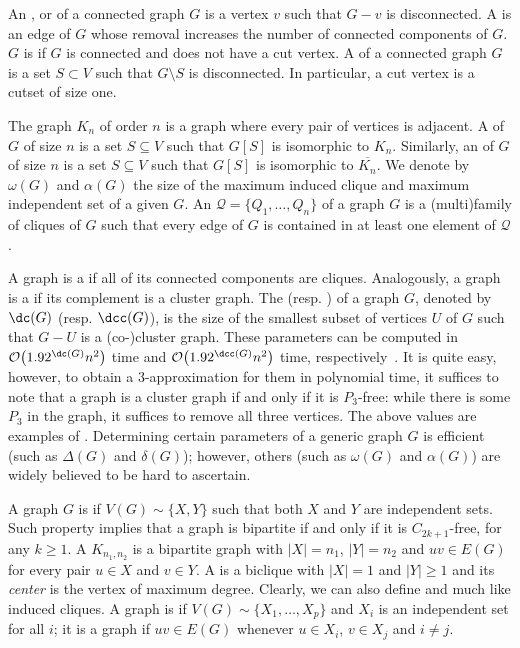 An ,  or  of a connected graph $G$ is a vertex $v$ such that $G - v$ is disconnected.
A  is an edge of $G$ whose removal increases the number of connected components of $G$.
$G$ is  if $G$ is connected and does not have a cut vertex.
A  of a connected graph $G$ is a set $S \subset V$ such that $G \setminus S$ is disconnected.
In particular, a cut vertex is a cutset of size one.

The  graph $K_n$ of order $n$ is a graph where every pair of vertices is adjacent.
A  of $G$ of size $n$ is a set $S \subseteq V$ such that $G[S]$ is isomorphic to $K_n$.
Similarly, an  of $G$ of size $n$ is a set $S \subseteq V$ such that $G[S]$ is isomorphic to $\overline{K_n}$.
We denote by $\omega(G)$ and $\alpha(G)$ the size of the maximum induced clique and maximum independent set of a given $G$.
An  $\mathcal{Q} = \{Q_1, \dots, Q_n\}$ of a graph $G$ is a (multi)family of cliques of $G$ such that every edge of $G$ is contained in at least one element of $\mathcal{Q}$.

A graph is a  if all of its connected components are cliques.
Analogously, a graph is a  if its complement is a cluster graph.
The  (resp. ) of a graph $G$, denoted by $\dc(G)$ (resp. $\dcc(G)$), is the size of the smallest subset of vertices $U$ of $G$ such that $G - U$ is a (co-)cluster graph.
These parameters can be computed in $\bigO{1.92^{\dc( G )}n^2 }$
time and $\bigO{1.92^{\dcc( G )}n^2 }$ time, respectively~\citep{branching-cluster}.
It is quite easy, however, to obtain a 3-approximation for them in polynomial time, it suffices to note that a graph is a cluster graph if and only if it is $P_3$-free: while there is some $P_3$ in the graph, it suffices to remove all three vertices.
The above values are examples of .
Determining certain parameters of a generic graph $G$ is efficient (such as $\Delta(G)$ and $\delta(G)$); however, others (such as $\omega(G)$ and $\alpha(G)$) are widely believed to be hard to ascertain.

A graph $G$ is  if $V(G) \sim \{X, Y\}$ such that both $X$ and $Y$ are independent sets.
Such property implies that a graph is bipartite if and only if it is $C_{2k+1}$-free, for any $k \geq 1$.
A  $K_{n_1,n_2}$ is a bipartite graph with $|X| = n_1$, $|Y| = n_2$ and $uv \in E(G)$ for every pair $u \in X$ and $v \in Y$.
A  is a biclique with $|X| = 1$ and $|Y| \geq 1$ and its \textit{center} is the vertex of maximum degree.
Clearly, we can also define  and  much like induced cliques.
A graph is  if $V(G) \sim \{X_1, \dots,  X_p\}$ and $X_i$ is an independent set for all $i$; it is a  graph if $uv \in E(G)$ whenever $u \in X_i$, $v \in X_j$ and $i \neq j$.


